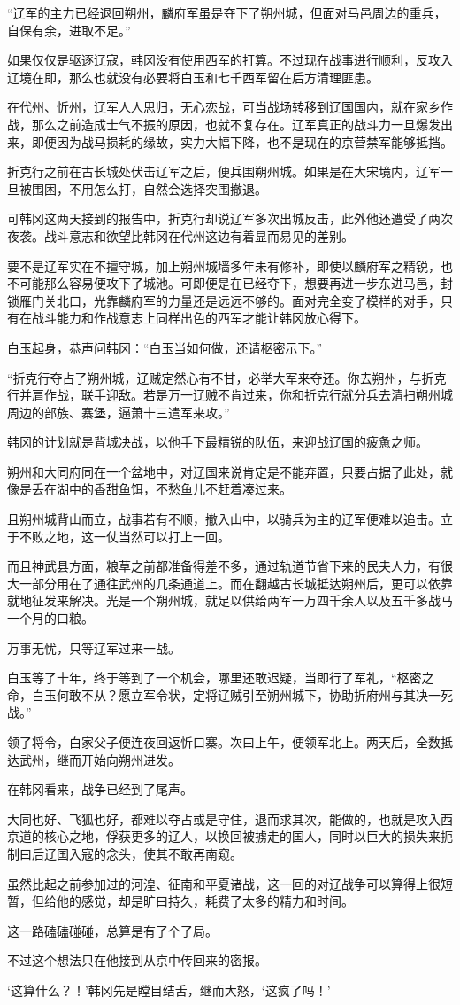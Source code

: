 “辽军的主力已经退回朔州，麟府军虽是夺下了朔州城，但面对马邑周边的重兵，自保有余，进取不足。”

如果仅仅是驱逐辽寇，韩冈没有使用西军的打算。不过现在战事进行顺利，反攻入辽境在即，那么也就没有必要将白玉和七千西军留在后方清理匪患。

在代州、忻州，辽军人人思归，无心恋战，可当战场转移到辽国国内，就在家乡作战，那么之前造成士气不振的原因，也就不复存在。辽军真正的战斗力一旦爆发出来，即便因为战马损耗的缘故，实力大幅下降，也不是现在的京营禁军能够抵挡。

折克行之前在古长城处伏击辽军之后，便兵围朔州城。如果是在大宋境内，辽军一旦被围困，不用怎么打，自然会选择突围撤退。

可韩冈这两天接到的报告中，折克行却说辽军多次出城反击，此外他还遭受了两次夜袭。战斗意志和欲望比韩冈在代州这边有着显而易见的差别。

要不是辽军实在不擅守城，加上朔州城墙多年未有修补，即使以麟府军之精锐，也不可能那么容易便攻下了城池。可即便是在已经夺下，想要再进一步东进马邑，封锁雁门关北口，光靠麟府军的力量还是远远不够的。面对完全变了模样的对手，只有在战斗能力和作战意志上同样出色的西军才能让韩冈放心得下。

白玉起身，恭声问韩冈：“白玉当如何做，还请枢密示下。”

“折克行夺占了朔州城，辽贼定然心有不甘，必举大军来夺还。你去朔州，与折克行并肩作战，联手迎敌。若是万一辽贼不肯过来，你和折克行就分兵去清扫朔州城周边的部族、寨堡，逼萧十三遣军来攻。”

韩冈的计划就是背城决战，以他手下最精锐的队伍，来迎战辽国的疲惫之师。

朔州和大同府同在一个盆地中，对辽国来说肯定是不能弃置，只要占据了此处，就像是丢在湖中的香甜鱼饵，不愁鱼儿不赶着凑过来。

且朔州城背山而立，战事若有不顺，撤入山中，以骑兵为主的辽军便难以追击。立于不败之地，这一仗当然可以打上一回。

而且神武县方面，粮草之前都准备得差不多，通过轨道节省下来的民夫人力，有很大一部分用在了通往武州的几条通道上。而在翻越古长城抵达朔州后，更可以依靠就地征发来解决。光是一个朔州城，就足以供给两军一万四千余人以及五千多战马一个月的口粮。

万事无忧，只等辽军过来一战。

白玉等了十年，终于等到了一个机会，哪里还敢迟疑，当即行了军礼，“枢密之命，白玉何敢不从？愿立军令状，定将辽贼引至朔州城下，协助折府州与其决一死战。”

领了将令，白家父子便连夜回返忻口寨。次曰上午，便领军北上。两天后，全数抵达武州，继而开始向朔州进发。

在韩冈看来，战争已经到了尾声。

大同也好、飞狐也好，都难以夺占或是守住，退而求其次，能做的，也就是攻入西京道的核心之地，俘获更多的辽人，以换回被掳走的国人，同时以巨大的损失来扼制曰后辽国入寇的念头，使其不敢再南窥。

虽然比起之前参加过的河湟、征南和平夏诸战，这一回的对辽战争可以算得上很短暂，但给他的感觉，却是旷曰持久，耗费了太多的精力和时间。

这一路磕磕碰碰，总算是有了个了局。

不过这个想法只在他接到从京中传回来的密报。

‘这算什么？！’韩冈先是瞠目结舌，继而大怒，‘这疯了吗！’
